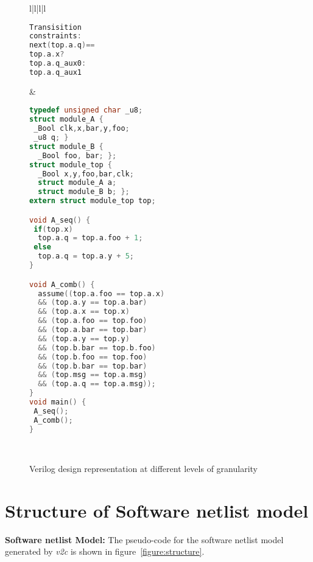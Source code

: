 \begin{figure}[h]
\begin{tabular}{l|l|l|l}
\begin{lstlisting}[mathescape=true,language=C]
Transisition 
constraints:
next(top.a.q)==
top.a.x? 
top.a.q_aux0:
top.a.q_aux1
\end{lstlisting}
&
\begin{lstlisting}[mathescape=true,language=C]
typedef unsigned char _u8;
struct module_A {
 _Bool clk,x,bar,y,foo;
 _u8 q; }
struct module_B {
  _Bool foo, bar; };
struct module_top {
  _Bool x,y,foo,bar,clk;
  struct module_A a;
  struct module_B b; };
extern struct module_top top;

void A_seq() {
 if(top.x)
  top.a.q = top.a.foo + 1;
 else
  top.a.q = top.a.y + 5;
}

void A_comb() {
  assume((top.a.foo == top.a.x)
  && (top.a.y == top.a.bar) 
  && (top.a.x == top.x)
  && (top.a.foo == top.foo) 
  && (top.a.bar == top.bar)
  && (top.a.y == top.y) 
  && (top.b.bar == top.b.foo)
  && (top.b.foo == top.foo) 
  && (top.b.bar == top.bar)
  && (top.msg == top.a.msg) 
  && (top.a.q == top.a.msg));
}
void main() {
 A_seq(); 
 A_comb();
}
\end{lstlisting}
\\
\hline
\end{tabular}
\caption{Verilog design representation at different levels of granularity}
\label{fig:v2c-example}
\end{figure}

\section {Structure of Software netlist model}
\textbf{Software netlist Model:} The pseudo-code for the software netlist 
model generated by \emph{v2c} is shown in figure~\ref{figure:structure}.

